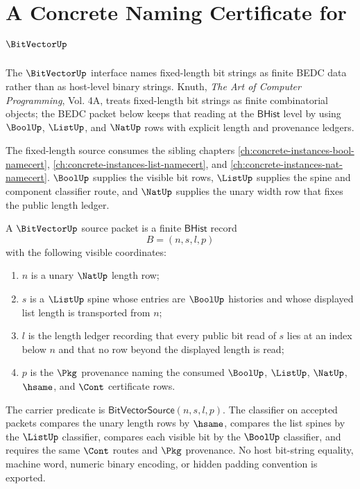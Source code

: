 \chapter{A Concrete Naming Certificate for $\BitVectorUp$}
\label{ch:concrete-instances-bitvector-namecert}

The $\BitVectorUp$ interface names fixed-length bit strings as finite BEDC
data rather than as host-level binary strings. Knuth, \emph{The Art of
Computer Programming}, Vol. 4A, treats fixed-length bit strings as finite
combinatorial objects; the BEDC packet below keeps that reading at the
$\mathsf{BHist}$ level by using $\BoolUp$, $\ListUp$, and $\NatUp$ rows with
explicit length and provenance ledgers.

The fixed-length source consumes the sibling chapters \autoref{ch:concrete-instances-bool-namecert}, \autoref{ch:concrete-instances-list-namecert}, and \autoref{ch:concrete-instances-nat-namecert}. $\BoolUp$ supplies the visible bit rows, $\ListUp$ supplies the spine and component classifier route, and $\NatUp$ supplies the unary width row that fixes the public length ledger.

\begin{definition}\label{def:bitvector-bhist-source}
A $\BitVectorUp$ source packet is a finite $\mathsf{BHist}$ record
$$
B=(n,s,l,p)
$$
with the following visible coordinates:
\begin{enumerate}
\item $n$ is a unary $\NatUp$ length row;
\item $s$ is a $\ListUp$ spine whose entries are $\BoolUp$ histories and whose
displayed list length is transported from $n$;
\item $l$ is the length ledger recording that every public bit read of $s$
lies at an index below $n$ and that no row beyond the displayed length is read;
\item $p$ is the $\Pkg$ provenance naming the consumed $\BoolUp$, $\ListUp$,
$\NatUp$, $\hsame$, and $\Cont$ certificate rows.
\end{enumerate}
The carrier predicate is $\mathsf{BitVectorSource}(n,s,l,p)$. The classifier
on accepted packets compares the unary length rows by $\hsame$, compares the
list spines by the $\ListUp$ classifier, compares each visible bit by the
$\BoolUp$ classifier, and requires the same $\Cont$ routes and $\Pkg$
provenance. No host bit-string equality, machine word, numeric binary
encoding, or hidden padding convention is exported.
\end{definition}

